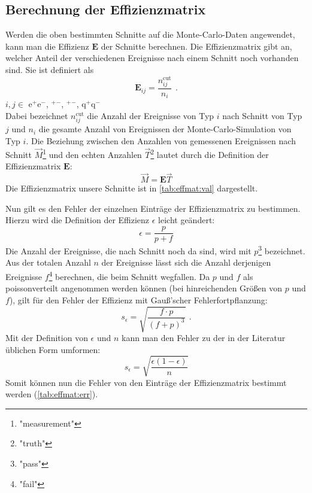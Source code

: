 \subsection{Berechnung der Effizienzmatrix}
Werden die oben bestimmten Schnitte auf die Monte-Carlo-Daten angewendet, kann man die Effizienz $\bm{E}$ der Schnitte berechnen.
Die Effizienzmatrix gibt an, welcher Anteil der verschiedenen Ereignisse nach einem Schnitt noch vorhanden sind. Sie ist definiert als
\begin{equation}
    \bm{E}_{ij} = \frac{n_{ij}^\text{cut}}{n_i} \ \, .
\end{equation}
$i, j \in $ e$^+$e$^-$, \textmu$^+$\textmu$^-$, \texttau$^+$\texttau$^-$, q$^+$q$^-$ \\  %
Dabei bezeichnet $n_{ij}^\text{cut}$ die Anzahl der Ereignisse von Typ $i$ nach Schnitt von Typ $j$ und $n_i$ die gesamte Anzahl von Ereignissen
der Monte-Carlo-Simulation von Typ $i$.
Die Beziehung zwischen den Anzahlen von gemessenen Ereignissen nach Schnitt $\vec{M}$\footnote{"measurement"} und den echten Anzahlen
$\vec{T}$\footnote{"truth"} lautet durch die Definition der Effizienzmatrix $\bm{E}$:
\begin{equation}
    \label{eq:effmat:mtrel}
    \vec{M} = \bm{E} \vec{T}
\end{equation}
Die Effizienzmatrix unsere Schnitte ist in \autoref{tab:effmat:val} dargestellt.

Nun gilt es den Fehler der einzelnen Einträge der Effizienzmatrix zu bestimmen. Hierzu wird die Definition der Effizienz $\epsilon$ leicht geändert:
\begin{equation}
    \epsilon = \frac{p}{p+f}
\end{equation}
Die Anzahl der Ereignisse, die nach Schnitt noch da sind, wird mit $p$\footnote{"pass"} bezeichnet. Aus der totalen Anzahl $n$ der Ereignisse lässt
sich die Anzahl derjenigen Ereignisse $f$\footnote{"fail"} berechnen, die beim Schnitt wegfallen. Da $p$ und $f$ als poissonverteilt angenommen
werden können (bei hinreichenden Größen von $p$ und $f$), gilt für den Fehler der Effizienz mit Gauß'scher Fehlerfortpflanzung:
\begin{equation}
    s_\epsilon = \sqrt{\frac{f \cdot p}{ \left( f + p \right)^3}} \ \, .
\end{equation}
Mit der Definition von $\epsilon$ und $n$ kann man den Fehler zu der in der Literatur üblichen Form umformen:
\begin{equation}
    s_\epsilon = \sqrt{\frac{\epsilon (1-\epsilon)}{n}}
\end{equation}
Somit können nun die Fehler von den Einträge der Effizienzmatrix bestimmt werden (\autoref{tab:effmat:err}).


